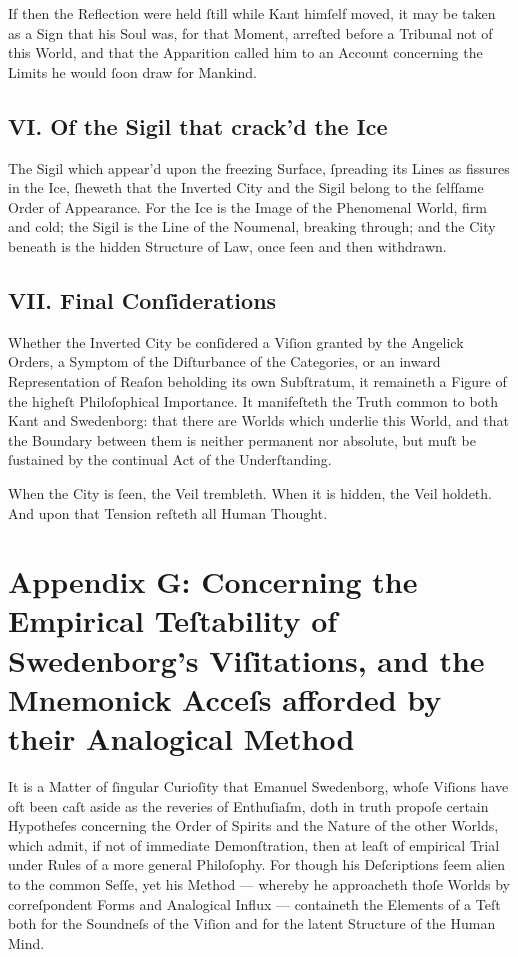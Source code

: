 \documentclass[12pt]{article}
\begin{document}
If then the Reflection were held ſtill while Kant himſelf moved, it may be 
taken as a Sign that his Soul was, for that Moment, arreſted before a 
Tribunal not of this World, and that the Apparition called him to an 
Account concerning the Limits he would ſoon draw for Mankind.

\subsection*{VI. Of the Sigil that crack’d the Ice}
The Sigil which appear’d upon the freezing Surface, ſpreading its Lines as 
fissures in the Ice, ſheweth that the Inverted City and the Sigil belong to 
the ſelfſame Order of Appearance. For the Ice is the Image of the 
Phenomenal World, firm and cold; the Sigil is the Line of the Noumenal, 
breaking through; and the City beneath is the hidden Structure of Law, 
once ſeen and then withdrawn.

\subsection*{VII. Final Conſiderations}
Whether the Inverted City be conſidered a Viſion granted by the Angelick 
Orders, a Symptom of the Diſturbance of the Categories, or an inward 
Representation of Reaſon beholding its own Subſtratum, it remaineth a 
Figure of the higheſt Philoſophical Importance. It manifeſteth the Truth 
common to both Kant and Swedenborg: that there are Worlds which underlie 
this World, and that the Boundary between them is neither permanent nor 
absolute, but muſt be ſustained by the continual Act of the Underſtanding.

When the City is ſeen, the Veil trembleth.
When it is hidden, the Veil holdeth.
And upon that Tension reſteth all Human Thought.

\newpage

\section*{Appendix G: Concerning the Empirical Teſtability of Swedenborg’s Viſitations, and the Mnemonick Acceſs afforded by their Analogical Method}

It is a Matter of ſingular Curioſity that Emanuel Swedenborg, whoſe Viſions 
have oft been caſt aside as the reveries of Enthuſiaſm, doth in truth propoſe 
certain Hypotheſes concerning the Order of Spirits and the Nature of the 
other Worlds, which admit, if not of immediate Demonſtration, then at leaſt 
of empirical Trial under Rules of a more general Philoſophy. For though his 
Deſcriptions ſeem alien to the common Seſſe, yet his Method — whereby he 
approacheth thoſe Worlds by correſpondent Forms and Analogical Influx — 
containeth the Elements of a Teſt both for the Soundneſs of the Viſion and 
for the latent Structure of the Human Mind.
\end{document}
